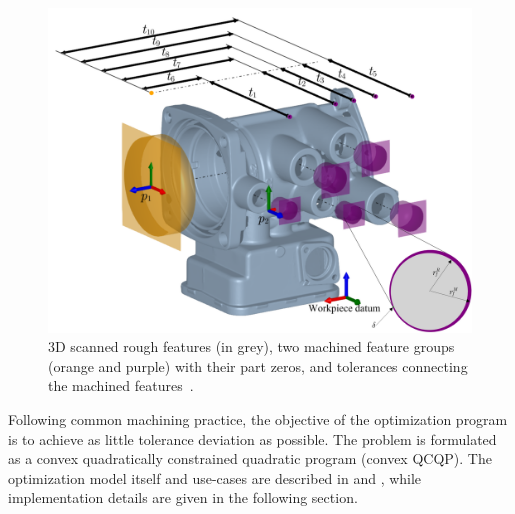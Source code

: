 \documentclass{juliacon}
\begin{document}
\begin{figure}[b]
	\centerline{\includegraphics[width=0.95\columnwidth]{cirp-annals-2023-figure-2.png}}
	\caption{3D scanned rough features (in grey), two machined feature groups (orange and purple) with their part zeros, and tolerances connecting the machined features~\cite{cserteg:2023_Annals}.}
	\label{fig:hatfig}
\end{figure}




Following common machining practice, the objective of the optimization program is to achieve as little tolerance deviation as possible.
The problem is formulated as a convex quadratically constrained quadratic program (convex QCQP).
The optimization model itself and use-cases are described in \cite{cserteg:2023_CMS} and \cite{cserteg:2023_Annals}, while implementation details are given in the following section.

\end{document}
